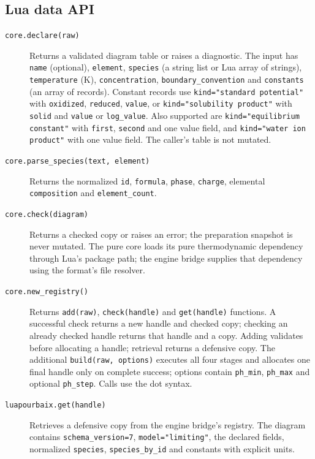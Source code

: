 \documentclass[a4paper,11pt]{ltxdoc}
\begin{document}
\subsection{Lua data API}
\begin{description}
  \item[\texttt{core.declare(raw)}] Returns a validated diagram table or raises a
    diagnostic. The input has \texttt{name} (optional), \texttt{element},
    \texttt{species} (a string list or Lua array of strings),
    \texttt{temperature} (K), \texttt{concentration}, \texttt{boundary\_convention} and
    \texttt{constants} (an array of records). Constant records use
    \texttt{kind="standard potential"} with \texttt{oxidized}, \texttt{reduced},
    \texttt{value}, or \texttt{kind="solubility product"} with \texttt{solid} and
    \texttt{value} or \texttt{log\_value}. Also supported are
    \texttt{kind="equilibrium constant"} with \texttt{first}, \texttt{second}
    and one value field, and \texttt{kind="water ion product"} with one value
    field. The caller's table is not mutated.
  \item[\texttt{core.parse\_species(text, element)}] Returns the normalized
    \texttt{id}, \texttt{formula}, \texttt{phase}, \texttt{charge}, elemental
    \texttt{composition} and \texttt{element\_count}.
  \item[\texttt{core.check(diagram)}] Returns a checked copy or raises an error;
    the preparation snapshot is never mutated. The pure core loads its pure
    thermodynamic dependency through Lua's package path; the engine bridge
    supplies that dependency using the format's file resolver.
  \item[\texttt{core.new\_registry()}] Returns \texttt{add(raw)},
    \texttt{check(handle)} and \texttt{get(handle)} functions. A successful check
    returns a new handle and checked copy; checking an already checked handle
    returns that handle and a copy. Adding validates before allocating a handle;
    retrieval returns a defensive copy. The additional \texttt{build(raw, options)}
    executes all four stages and allocates one final handle only on complete
    success; options contain \texttt{ph\_min}, \texttt{ph\_max} and optional
    \texttt{ph\_step}. Calls use the dot syntax.
  \item[\texttt{luapourbaix.get(handle)}] Retrieves a defensive copy from the
    engine bridge's registry. The diagram contains \texttt{schema\_version=7},
    \texttt{model="limiting"}, the declared fields, normalized \texttt{species},
    \texttt{species\_by\_id} and constants with explicit units.

\end{description}
\end{document}
